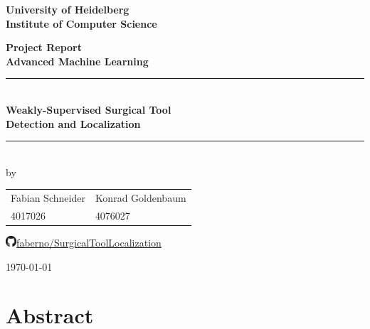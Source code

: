 \documentclass[
     12pt,         %
     a4paper,      %
     DIV=14,        %
     ]{scrreprt}
\date{\today}
\begin{document}
\begin{titlepage}


\vspace*{1cm}
\begin{center}
\vspace*{3cm}
\textbf{ 
\Large University of Heidelberg\\
\smallskip
\Large Institute of Computer Science\\
\smallskip
}

\vspace{2cm}

\textbf{\Large Project Report\\[0.4 cm]	 \large Advanced Machine Learning} %

\vspace{1.5\baselineskip}
\rule{\linewidth}{0.2 mm} \\[0.4 cm]
{\huge
\textbf{Weakly-Supervised Surgical Tool}\\
\bigskip
\textbf{Detection and Localization}
}\\
\bigskip
\rule{\linewidth}{0.2 mm} \\[1.0 cm]

by\\[0.5cm]


\begin{table}[h]
	\large
	\centering
	\begin{tabular}{P{5.5cm}P{5cm}}
		Fabian Schneider & Konrad Goldenbaum \\ 
		4017026 & 4076027 \\
	\end{tabular}
\end{table}

\vspace{0.5cm}
\includegraphics[width=0.4cm]{github}\hspace{0.15cm}\href{https://github.com/faberno/SurgicalToolLocalization}{faberno/SurgicalToolLocalization}
\vfill

\today


\end{center}

\end{titlepage}

\chapter*{Abstract}

\end{document}
